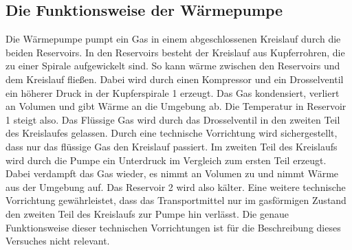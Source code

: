 \subsection{Die Funktionsweise der Wärmepumpe \cite[vgl.][]{man:v206}} %
\label{sec:funktionsweise}
Die Wärmepumpe pumpt ein Gas in einem abgeschlossenen Kreislauf durch die beiden Reservoirs.
In den Reservoirs besteht der Kreislauf aus Kupferrohren, die zu einer Spirale aufgewickelt sind.
So kann wärme zwischen den Reservoirs und dem Kreislauf fließen.
Dabei wird durch einen Kompressor und ein Drosselventil ein höherer Druck in der Kupferspirale 1 erzeugt.
Das Gas kondensiert,  verliert an Volumen und gibt Wärme an die Umgebung ab.
Die Temperatur in Reservoir 1 steigt also. 
Das Flüssige Gas wird durch das Drosselventil in den zweiten Teil des Kreislaufes gelassen.
Durch eine technische Vorrichtung wird sichergestellt, dass nur das flüssige Gas den Kreislauf passiert.
Im zweiten Teil des Kreislaufs wird durch die Pumpe ein Unterdruck im Vergleich zum ersten Teil erzeugt.
Dabei verdampft das Gas wieder, es nimmt an Volumen zu und nimmt Wärme aus der Umgebung auf.
Das Reservoir 2 wird also kälter.
Eine weitere technische Vorrichtung gewährleistet, dass das Transportmittel nur im gasförmigen Zustand 
den zweiten Teil des Kreislaufs zur Pumpe hin verlässt.
Die genaue Funktionsweise dieser technischen Vorrichtungen ist für die Beschreibung dieses Versuches nicht relevant.
